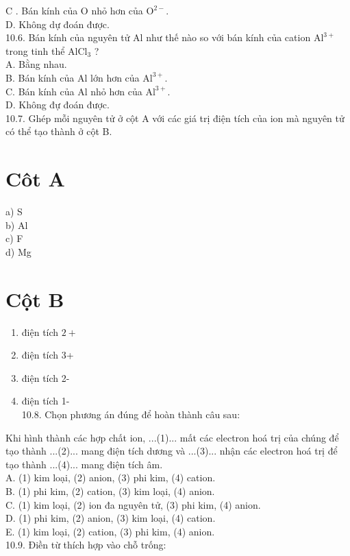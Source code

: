 \documentclass[10pt]{article}
\begin{document}
C . Bán kính của O nhỏ hơn của $\mathrm{O}^{2-}$.\\
D. Không dự đoán được.\\
10.6. Bán kính của nguyên tử Al như thế nào so với bán kính của cation $\mathrm{Al}^{3+}$ trong tinh thể $\mathrm{AlCl}_{3}$ ?\\
A. Bằng nhau.\\
B. Bán kính của Al lớn hơn của $\mathrm{Al}^{3+}$.\\
C. Bán kính của Al nhỏ hơn của $\mathrm{Al}^{3+}$.\\
D. Không đự đoán được.\\
10.7. Ghép mỗi nguyên tử ở cột A với các giá trị điện tích của ion mà nguyên tử có thể tạo thành ở cột B.

\section*{Côt A}
a) S\\
b) Al\\
c) F\\
d) Mg

\section*{Cột B}
\begin{enumerate}
  \item điện tích $2+$
  \item điện tích 3+
  \item điện tích 2-
  \item điện tích 1-\\
10.8. Chọn phương án đúng để hoàn thành câu sau:
\end{enumerate}

Khi hình thành các hợp chất ion, ...(1)... mất các electron hoá trị của chúng để tạo thành ...(2)... mang điện tích dương và ...(3)... nhận các electron hoá trị để tạo thành ...(4)... mang điện tích âm.\\
A. (1) kim loại, (2) anion, (3) phi kim, (4) cation.\\
B. (1) phi kim, (2) cation, (3) kim loại, (4) anion.\\
C. (1) kim loại, (2) ion đa nguyên tử, (3) phi kim, (4) anion.\\
D. (1) phi kim, (2) anion, (3) kim loại, (4) cation.\\
E. (1) kim loại, (2) cation, (3) phi kim, (4) anion.\\
10.9. Điền từ thích hợp vào chỗ trống:
\end{document}
